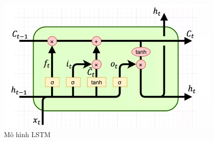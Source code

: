 \begin{figure}
	\centering
	\includegraphics[scale=0.3]{img/lstm.png}
	\caption{Mô hình LSTM}
	\label{lstm}
\end{figure}